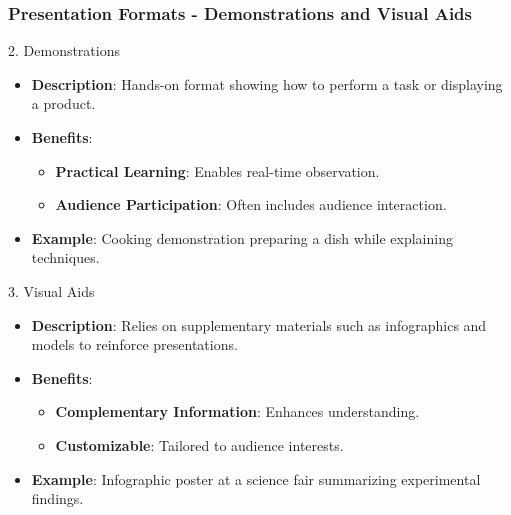 \documentclass[aspectratio=169]{beamer}
\begin{document}
\begin{frame}[fragile]
    \frametitle{Presentation Formats - Demonstrations and Visual Aids}
    \begin{block}{2. Demonstrations}
        \begin{itemize}
            \item \textbf{Description}: Hands-on format showing how to perform a task or displaying a product.
            \item \textbf{Benefits}:
                \begin{itemize}
                    \item \textbf{Practical Learning}: Enables real-time observation.
                    \item \textbf{Audience Participation}: Often includes audience interaction.
                \end{itemize}
            \item \textbf{Example}: Cooking demonstration preparing a dish while explaining techniques.
        \end{itemize}
    \end{block}
    \begin{block}{3. Visual Aids}
        \begin{itemize}
            \item \textbf{Description}: Relies on supplementary materials such as infographics and models to reinforce presentations.
            \item \textbf{Benefits}:
                \begin{itemize}
                    \item \textbf{Complementary Information}: Enhances understanding.
                    \item \textbf{Customizable}: Tailored to audience interests.
                \end{itemize}
            \item \textbf{Example}: Infographic poster at a science fair summarizing experimental findings.
        \end{itemize}
    \end{block}
\end{frame}
\end{document}
